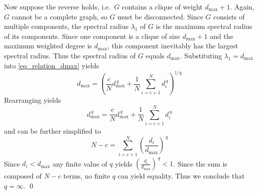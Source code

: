 \documentclass{comnet}%
\begin{document}
Now suppose the reverse holds, i.e.\ $G$ contains a clique of weight $d_{\max}+1$. Again, $G$ cannot be a complete graph, so $G$ must be disconnected. Since $G$ consists of multiple components, the spectral radius $\lambda_1$ of $G$ is the maximum spectral radius of its components. Since one component is a clique of size $d_{\max}+1$ and the maximum weighted degree is $d_{\max}$, this component inevitably has the largest spectral radius. Thus the spectral radius of $G$ equals $d_{\max}$. Substituting $\lambda_1 = d_{\max}$ into \eqref{eq_relation_dmax} yields
\begin{equation*}
	d_{\max} = \left( \frac{c}{N} d_{\max}^{\, q} + \frac{1}{N} \sum_{i=c+1}^N d_i^{\, q} \right)^{1/q}
\end{equation*}
Rearranging yields
\begin{equation*}
	d_{\max}^{\, q} = \frac{c}{N} d_{\max}^{\, q} + \frac{1}{N} \sum_{i=c+1}^N d_i^{\, q}
\end{equation*}
and can be further simplified to
\begin{equation*}
	N - c = \sum_{i=c+1}^N \left( \frac{d_i}{d_{\max}} \right)^{\, q}
\end{equation*}
Since $d_i < d_{\max}$ any finite value of $q$ yields $\left( \frac{d_i}{d_{\max}} \right)^{\, q} < 1$. Since the sum is composed of $N-c$ terms, no finite $q$ can yield equality. Thus we conclude that $q=\infty$. \hfill\qed
\end{document}
